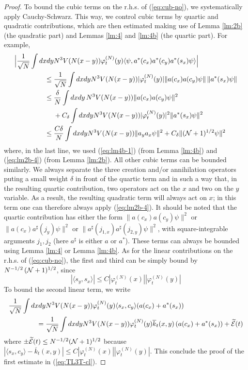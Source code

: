 \documentclass[11pt,a4paper,DIV11]{scrartcl}	%
\newcommand{\wt}{\widetilde}
\newcommand{\cE}{{\cal E}}
\newcommand{\cN}{{\cal N}}
\begin{document}
\begin{proof}
To bound the cubic terms on the r.h.s. of (\ref{eq:cub-no}), we systematically apply Cauchy-Schwarz.
This way, we control cubic terms by quartic and quadratic contributions, which are then estimated making use of Lemma \ref{lm:2b} (the quadratic part) and Lemmas \ref{lm:4} and \ref{lm:4b} (the quartic part). For example,
\[ \begin{split} \Big| \frac{1}{\sqrt{N}}\int dx dy &N^3 V(N(x-y)) \varphi_t^{(N)} (y) \langle  \psi , a^* (c_x) a^* (c_y) a^* (s_x) \psi \rangle \Big| \\ \leq \; &  \frac{1}{\sqrt{N}} \int dx dy N^3 V (N (x-y)) |\varphi_t^{(N)} (y)|  \| a (c_x) a (c_y) \psi \| \, \| a^* (s_x) \psi \| \\ \leq \; & \frac{\delta}{N}  \int dx dy \, N^3 V (N (x-y)) \| a (c_x) a(c_y) \psi \|^2 \\ &+ C_\delta\int dx dy N^3 V (N (x-y)) |\varphi_t^{(N)} (y)|^2 \| a^* (s_x)  \psi \|^2 \\ \leq \; & \frac{C \delta}{N} \int dx dy N^3 V(N (x-y)) \| a_y a_x \psi \|^2 + C_\delta  \| (\cN + 1)^{1/2}  \psi \|^2  \end{split} \]
where, in the last line, we used (\ref{eq:lm4b-1}) (from Lemma \ref{lm:4b}) and (\ref{eq:lm2b-4}) (from Lemma \ref{lm:2b}). All other cubic terms can be bounded similarly. We always separate the three creation and/or annihilation operators puting a small weight $\delta$ in front of the quartic term and
in such a way that, in the resulting quartic contribution, two operators act on the $x$ and two on the $y$ variable. As a result, the resulting quadratic term will always act on $x$; in this term one can therefore always apply (\ref{eq:lm2b-4}). It should be noted that the quartic contribution has either the form $\| a (c_x) a (c_y) \psi \|^2$ or $\| a (c_x) a^\sharp (j_y) \psi \|^2$ or $\| a^\sharp (j_{1,x}) a^\sharp (j_{2,y}) \psi \|^2$, with square-integrable arguments $j_1, j_2$ (here $a^\sharp$ is either $a$ or $a^*$). These terms can always be bounded using Lemma \ref{lm:4} or Lemma \ref{lm:4b}. As for the linear contributions on the r.h.s. of (\ref{eq:cub-no}), the first and third can be simply bound by $N^{-1/2} \, (\cN+1)^{1/2}$, since 
\[ |\langle s_y , s_x \rangle| \leq C |\varphi^{(N)}_t (x)| |\varphi^{(N)}_t (y)| \]
To bound the second linear term, we write 
\[ \begin{split} 
\frac{1}{\sqrt{N}} \int dx dy & N^3 V(N (x-y)) \varphi_t^{(N)} (y) \langle s_x, c_y \rangle (a(c_x) + a^* (s_x))  \\ = \; & \frac{1}{\sqrt{N}} \int dx dy  N^3 V(N (x-y)) \varphi_t^{(N)} (y) \overline{k}_t (x,y) \, (a(c_x) + a^* (s_x)) + \wt{\cE} (t) \end{split} \]
where $\pm \wt{\cE} (t) \leq N^{-1/2} (\cN+1)^{1/2}$ because $|\langle s_x , c_y \rangle - \overline{k}_t (x,y)| \leq C |\varphi_t^{(N)} (x)| |\varphi_t^{(N)} (y)|$. This conclude the proof of the first estimate in (\ref{eq:TL3T-cl}). 


\end{proof}
\end{document}
